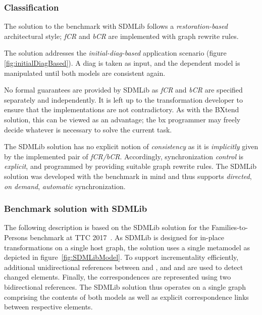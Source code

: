 \subsubsection{Classification}
The solution to the benchmark with SDMLib follows a \emph{restoration-based} architectural style; \emph{fCR} and \emph{bCR} are implemented with graph rewrite rules. 

The solution addresses the \emph{initial-diag-based} application scenario (figure \ref{fig:initialDiagBased}).
A diag is taken as input, and the dependent model is manipulated until both models are consistent again. 

No formal guarantees are provided by SDMLib as \emph{fCR} and \emph{bCR} are specified separately and independently.
It is left up to the transformation developer to ensure that the implementations are not contradictory.
As with the BXtend solution, this can be viewed as an advantage; the bx programmer may freely decide whatever is necessary to solve the current task.

The SDMLib solution has no explicit notion of \emph{consistency} as it is \emph{implicitly} given by the implemented pair of \emph{fCR/bCR}.
Accordingly, synchronization \emph{control} is \emph{explicit}, and programmed by providing suitable graph rewrite rules.
The SDMLib solution was developed with the benchmark in mind and thus supports \emph{directed}, \emph{on demand}, \emph{automatic} synchronization. 

\subsubsection{Benchmark solution with SDMLib}

The following description is based on the SDMLib solution for the Families-to-Persons benchmark at TTC 2017~\cite{Zundorf2017}.
As SDMLib is designed for in-place transformations on a single host graph, the solution uses a single metamodel as depicted in figure~\ref{fig:SDMLibModel}.
To support incrementality efficiently, additional unidirectional references between  and , and  and  are used to detect changed elements.
Finally, the correspondences are represented using two bidirectional references.
The SDMLib solution thus operates on a single graph comprising the contents of both models as well as explicit correspondence links between respective elements. 


